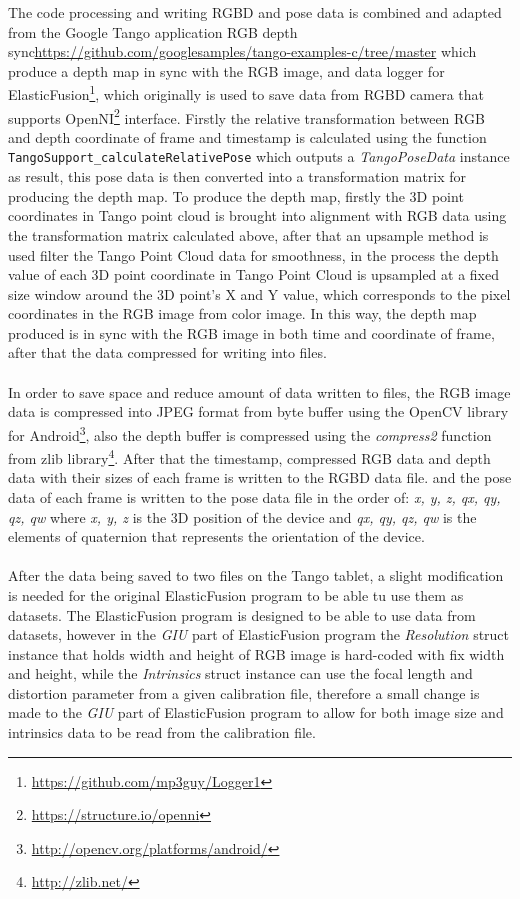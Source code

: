 \documentclass[12pt,twoside]{article}
\begin{document}
The code processing and writing RGBD and pose data is combined and adapted from the Google Tango application RGB depth sync{\url{https://github.com/googlesamples/tango-examples-c/tree/master}} which produce a depth map in sync with the RGB image, and data logger for ElasticFusion\footnote{\url{https://github.com/mp3guy/Logger1}}, which originally is used to save data from RGBD camera that supports OpenNI\footnote{\url{https://structure.io/openni}} interface. Firstly the relative transformation between RGB and depth coordinate of frame and timestamp is calculated using the function \verb|TangoSupport_calculateRelativePose| which outputs a \textit{TangoPoseData} instance as result, this pose data is then converted into a transformation matrix for producing the depth map. To produce the depth map, firstly the 3D point coordinates in Tango point cloud is brought into alignment with RGB data using the transformation matrix calculated above, after that an upsample method is used filter the Tango Point Cloud data for smoothness, in the process the depth value of each 3D point coordinate in Tango Point Cloud is upsampled at a fixed size window around the 3D point's X and Y value, which corresponds to the pixel coordinates in the RGB image from color image. In this way, the depth map produced is in sync with the RGB image in both time and coordinate of frame, after that the data compressed for writing into files.\\
\\
In order to save space and reduce amount of data written to files, the RGB image data is compressed into JPEG format from byte buffer using the OpenCV library for Android\footnote{\url{http://opencv.org/platforms/android/}}, also the depth buffer is compressed using the \textit{compress2} function from zlib library\footnote{\url{http://zlib.net/}}. After that the timestamp, compressed RGB data and depth data with their sizes of each frame is written to the RGBD data file. and the pose data of each frame is written to the pose data file in the order of: \textit{x, y, z, qx, qy, qz, qw} where \textit{x, y, z} is the 3D position of the device and \textit{qx, qy, qz, qw} is the elements of quaternion that represents the orientation of the device.\\
\\
After the data being saved to two files on the Tango tablet, a slight modification is needed for the original ElasticFusion program to be able tu use them as datasets. The ElasticFusion program is designed to be able to use data from  datasets, however in the \textit{GIU} part of ElasticFusion program the \textit{Resolution} struct instance that holds width and height of RGB image is hard-coded with fix width and height, while the \textit{Intrinsics} struct instance can use the focal length and distortion parameter from a given calibration file, therefore a small change is made to the \textit{GIU} part of ElasticFusion program to allow for both image size and intrinsics data to be read from the calibration file.\\
\end{document}
